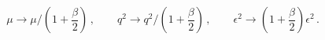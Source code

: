 \begin{equation}
\mu\rightarrow \mu/\left(1+\frac{\beta}{2}\right)\,,  \qquad 
q^2\rightarrow q^2/\left(1+\frac{\beta}{2}\right)\,, \qquad
\epsilon^2\rightarrow \left(1+\frac{\beta}{2}\right)\epsilon^2\,.
\label{rescaled}\end{equation}


